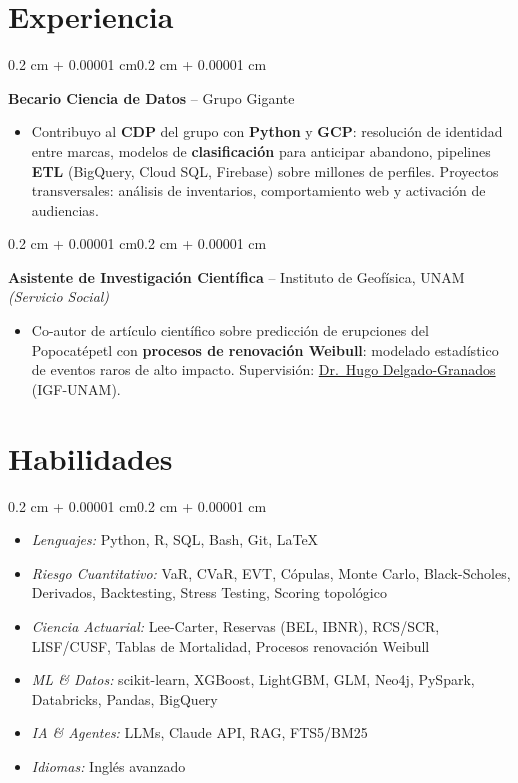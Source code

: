 \documentclass[10pt, letterpaper]{article}
\newenvironment{highlights}{
    \begin{itemize}[topsep=0.02 cm,parsep=0.05 cm,partopsep=0pt,itemsep=0pt,leftmargin=0.4 cm + 10pt]
}{\end{itemize}}
\newenvironment{highlightsforbulletentries}{
    \begin{itemize}[topsep=0.02 cm,parsep=0.02 cm,partopsep=0pt,itemsep=0pt,leftmargin=10pt]
}{\end{itemize}}
\newenvironment{onecolentry}{
    \begin{adjustwidth}{0.2 cm + 0.00001 cm}{0.2 cm + 0.00001 cm}
}{\end{adjustwidth}}
\let\hrefWithoutArrow\href
\renewcommand{\href}[2]{\hrefWithoutArrow{#1}{\ifthenelse{\equal{#2}{}}{ }{#2 }\raisebox{.15ex}{\footnotesize \faExternalLink*}}}
\begin{document}
    \section{Experiencia}
        \begin{onecolentry}
            \textbf{Becario Ciencia de Datos} -- Grupo Gigante
            \begin{highlights}
                \item Contribuyo al \textbf{CDP} del grupo con \textbf{Python} y \textbf{GCP}: resolución de identidad entre marcas, modelos de \textbf{clasificación} para anticipar abandono, pipelines \textbf{ETL} (BigQuery, Cloud SQL, Firebase) sobre millones de perfiles. Proyectos transversales: análisis de inventarios, comportamiento web y activación de audiencias.
            \end{highlights}
            \end{onecolentry}

        \vspace{0.02 cm}

        \begin{onecolentry}
            \textbf{Asistente de Investigación Científica} -- Instituto de Geofísica, UNAM \textit{(Servicio Social)}
            \begin{highlights}
                \item Co-autor de artículo científico sobre predicción de erupciones del Popocatépetl con \textbf{procesos de renovación Weibull}: modelado estadístico de eventos raros de alto impacto. Supervisión: \hrefWithoutArrow{https://scholar.google.com/citations?user=lDD0DZQAAAAJ}{Dr.\ Hugo Delgado-Granados} (IGF-UNAM).
            \end{highlights}
            \end{onecolentry}

    \section{Habilidades}
\begin{onecolentry}
    \begin{highlightsforbulletentries}
        \item \textit{Lenguajes:} Python, R, SQL, Bash, Git, \LaTeX
        \item \textit{Riesgo Cuantitativo:} VaR, CVaR, EVT, Cópulas, Monte Carlo, Black-Scholes, Derivados, Backtesting, Stress Testing, Scoring topológico
        \item \textit{Ciencia Actuarial:} Lee-Carter, Reservas (BEL, IBNR), RCS/SCR, LISF/CUSF, Tablas de Mortalidad, Procesos renovación Weibull
        \item \textit{ML \& Datos:} scikit-learn, XGBoost, LightGBM, GLM, Neo4j, PySpark, Databricks, Pandas, BigQuery
        \item \textit{IA \& Agentes:} LLMs, Claude API, RAG, FTS5/BM25
        \item \textit{Idiomas:} Inglés avanzado
    \end{highlightsforbulletentries}
\end{onecolentry}
\end{document}
